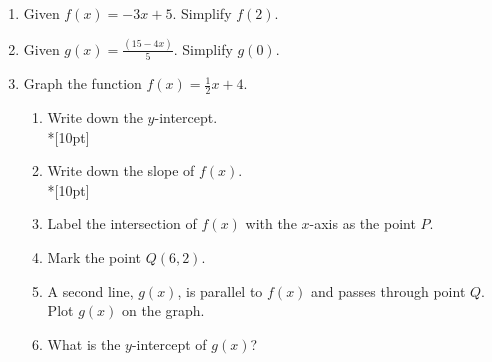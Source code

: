 \documentclass[12pt, oneside]{article}
\begin{document}
\begin{enumerate}
  \item Given $f(x)=-3x+5$. Simplify $f(2)$. \vspace{3cm}
  \item Given $\displaystyle g(x)=\frac{(15-4x)}{5}$. Simplify $g(0)$.  \vspace{3cm}

\newpage

\item Graph the function $f(x)=\frac{1}{2}x+4$.
\begin{enumerate}
    \item Write down the $y$-intercept.\\*[10pt]
    \item Write down the slope of $f(x)$.\\*[10pt]
    \item Label the intersection of $f(x)$ with the $x$-axis as the point $P$.
    \item Mark the point $Q (6, 2)$.
    \item A second line, $g(x)$, is parallel to $f(x)$ and passes through point $Q$. Plot $g(x)$ on the graph.
    \item What is the $y$-intercept of $g(x)$?
\end{enumerate}

\begin{center} %
\end{center}


\end{enumerate}
\end{document}
